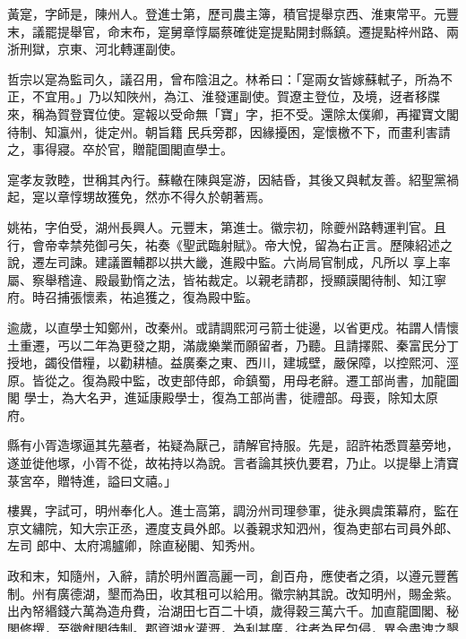 \begin{pinyinscope}
 黃寔，字師是，陳州人。登進士第，歷司農主簿，積官提舉京西、淮東常平。元豐末，議罷提舉官，命末布，寔舅章惇屬蔡確徙寔提點開封縣鎮。遷提點梓州路、兩浙刑獄，京東、河北轉運副使。



 哲宗以寔為監司久，議召用，曾布陰沮之。林希曰：「寔兩女皆嫁蘇軾子，所為不正，不宜用。」乃以知陜州，為江、淮發運副使。賀遼主登位，及境，迓者移牒來，稱為賀登寶位使。寔報以受命無「寶」字，拒不受。還除太僕卿，再擢寶文閣待制、知瀛州，徙定州。朝旨籍
 民兵旁郡，因緣擾困，寔懷檄不下，而畫利害請之，事得寢。卒於官，贈龍圖閣直學士。



 寔孝友敦睦，世稱其內行。蘇轍在陳與寔游，因結昏，其後又與軾友善。紹聖黨禍起，寔以章惇甥故獲免，然亦不得久於朝著焉。



 姚祐，字伯受，湖州長興人。元豐末，第進士。徽宗初，除夔州路轉運判官。且行，會帝幸禁苑御弓矢，祐奏《聖武臨射賦》。帝大悅，留為右正言。歷陳紹述之說，遷左司諫。建議置輔郡以拱大畿，進殿中監。六尚局官制成，凡所以
 享上率屬、察舉稽違、殿最勤惰之法，皆祐裁定。以親老請郡，授顯謨閣待制、知江寧府。時召捕張懷素，祐追獲之，復為殿中監。



 逾歲，以直學士知鄭州，改秦州。或請調熙河弓箭士徙邊，以省更戍。祐謂人情懷土重遷，丐以二年為更發之期，滿歲樂業而願留者，乃聽。且請擇熙、秦富民分丁授地，蠲役借糧，以勸耕植。益廣秦之東、西川，建城壁，嚴保障，以控熙河、涇原。皆從之。復為殿中監，改吏部侍郎，命鎮蜀，用母老辭。遷工部尚書，加龍圖閣
 學士，為大名尹，進延康殿學士，復為工部尚書，徙禮部。母喪，除知太原府。



 縣有小胥造塚逼其先墓者，祐疑為厭己，請解官持服。先是，詔許祐悉買墓旁地，遂並徙他塚，小胥不從，故祐持以為說。言者論其挾仇要君，乃止。以提舉上清寶菉宮卒，贈特進，謚曰文禧。」



 樓異，字試可，明州奉化人。進士高第，調汾州司理參軍，徙永興虞策幕府，監在京文繡院，知大宗正丞，遷度支員外郎。以養親求知泗州，復為吏部右司員外郎、左司
 郎中、太府鴻臚卿，除直秘閣、知秀州。



 政和末，知隨州，入辭，請於明州置高麗一司，創百舟，應使者之須，以遵元豐舊制。州有廣德湖，墾而為田，收其租可以給用。徽宗納其說。改知明州，賜金紫。出內帑緡錢六萬為造舟費，治湖田七百二十頃，歲得穀三萬六千。加直龍圖閣、秘閣修撰，至徽猷閣待制。郡資湖水灌溉，為利甚廣，往者為民包侵，異令盡洩之墾田。自是苦旱，鄉人怨之。




\end{pinyinscope}
